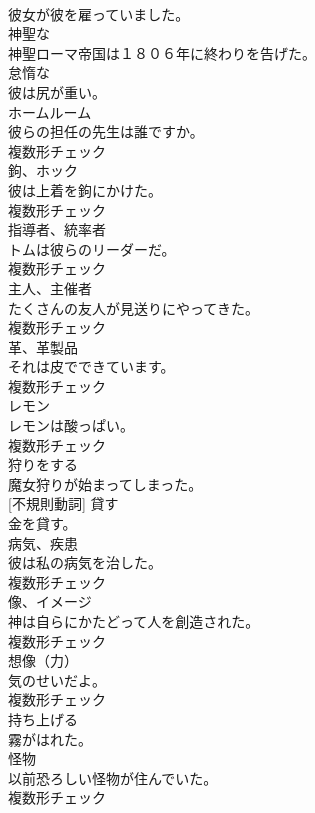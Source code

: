 \documentclass[8pt]{extreport}
\begin{document}
\begin{CJK}{UTF8}{min}
\\	彼女が彼を雇っていました。	
\\	[形容詞]	神聖な	
\\	神聖ローマ帝国は１８０６年に終わりを告げた。	
\\	[形容詞]	怠惰な	
\\	彼は尻が重い。	
\\	[名詞]	ホームルーム	
\\	彼らの担任の先生は誰ですか。	
\\	複数形チェック
\\	[名詞]	鉤、ホック	
\\	彼は上着を鉤にかけた。	
\\	複数形チェック
\\	[名詞]	指導者、統率者	
\\	トムは彼らのリーダーだ。	
\\	複数形チェック
\\	[名詞]	主人、主催者	
\\	たくさんの友人が見送りにやってきた。	
\\	複数形チェック
\\	[名詞]	革、革製品	
\\	それは皮でできています。	
\\	複数形チェック
\\	[名詞]	レモン	
\\	レモンは酸っぱい。	
\\	複数形チェック
\\	[動詞]	狩りをする	
\\	魔女狩りが始まってしまった。	
\\	[動詞] [不規則動詞]	貸す	
\\	金を貸す。	
\\	[名詞]	病気、疾患	
\\	彼は私の病気を治した。	
\\	複数形チェック
\\	[名詞]	像、イメージ	
\\	神は自らにかたどって人を創造された。	
\\	複数形チェック
\\	[名詞]	想像（力）	
\\	気のせいだよ。	
\\	複数形チェック
\\	[動詞]	持ち上げる	
\\	霧がはれた。	
\\	[名詞]	怪物	
\\	以前恐ろしい怪物が住んでいた。	
\\	複数形チェック

\end{CJK}
\end{document}
